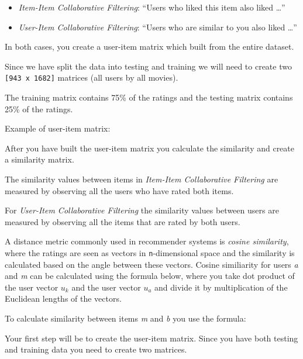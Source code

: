 \documentclass[11pt]{article}
\providecommand{\tightlist}{%
      \setlength{\itemsep}{0pt}\setlength{\parskip}{0pt}}
\begin{document}
\begin{itemize}
\tightlist
\item
  \emph{Item-Item Collaborative Filtering}: ``Users who liked this item
  also liked \ldots{}''
\item
  \emph{User-Item Collaborative Filtering}: ``Users who are similar to
  you also liked \ldots{}''
\end{itemize}

    In both cases, you create a user-item matrix which built from the entire
dataset.

Since we have split the data into testing and training we will need to
create two \texttt{{[}943\ x\ 1682{]}} matrices (all users by all
movies).

The training matrix contains 75\% of the ratings and the testing matrix
contains 25\% of the ratings.

    Example of user-item matrix: 

    After you have built the user-item matrix you calculate the similarity
and create a similarity matrix.

The similarity values between items in \emph{Item-Item Collaborative
Filtering} are measured by observing all the users who have rated both
items.

    For \emph{User-Item Collaborative Filtering} the similarity values
between users are measured by observing all the items that are rated by
both users.

    A distance metric commonly used in recommender systems is \emph{cosine
similarity}, where the ratings are seen as vectors in
\texttt{n}-dimensional space and the similarity is calculated based on
the angle between these vectors. Cosine similiarity for users \emph{a}
and \emph{m} can be calculated using the formula below, where you take
dot product of the user vector \emph{\(u_k\)} and the user vector
\emph{\(u_a\)} and divide it by multiplication of the Euclidean lengths
of the vectors.

To calculate similarity between items \emph{m} and \emph{b} you use the
formula:

Your first step will be to create the user-item matrix. Since you have
both testing and training data you need to create two matrices.
\end{document}
